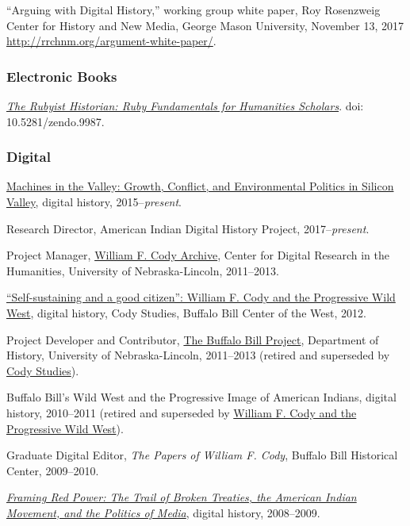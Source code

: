 ``Arguing with Digital History,'' working group white paper, Roy
Rosenzweig Center for History and New Media, George Mason University,
November 13, 2017 \url{http://rrchnm.org/argument-white-paper/}.

\subsubsection{Electronic Books}\label{electronic-books}

\emph{\href{http://hepplerj.github.io/rubyist-historian/}{The Rubyist
Historian: Ruby Fundamentals for Humanities Scholars}}. doi:
10.5281/zendo.9987.

\subsubsection{Digital}\label{digital}

\href{http://dissertation.jasonheppler.org}{Machines in the Valley:
Growth, Conflict, and Environmental Politics in Silicon Valley}, digital
history, 2015--\emph{present}.

Research Director, American Indian Digital History Project,
2017--\emph{present}.

Project Manager, \href{http://codyarchive.org/}{William F. Cody
Archive}, Center for Digital Research in the Humanities, University of
Nebraska-Lincoln, 2011--2013.

\href{http://www.codystudies.org/showindians/}{``Self-sustaining and a
good citizen'': William F. Cody and the Progressive Wild West}, digital
history, Cody Studies, Buffalo Bill Center of the West, 2012.

Project Developer and Contributor,
\href{http://buffalobillproject.unl.edu/}{The Buffalo Bill Project},
Department of History, University of Nebraska-Lincoln, 2011--2013
(retired and superseded by \href{http://www.codystudies.org/}{Cody
Studies}).

Buffalo Bill's Wild West and the Progressive Image of American Indians,
digital history, 2010--2011 (retired and superseded by
\href{http://www.codystudies.org/showindians/}{William F. Cody and the
Progressive Wild West}).

Graduate Digital Editor, \emph{The Papers of William F. Cody}, Buffalo
Bill Historical Center, 2009--2010.

\emph{\href{http://framingredpower.org}{Framing Red Power: The Trail of
Broken Treaties, the American Indian Movement, and the Politics of
Media}}, digital history, 2008--2009.

